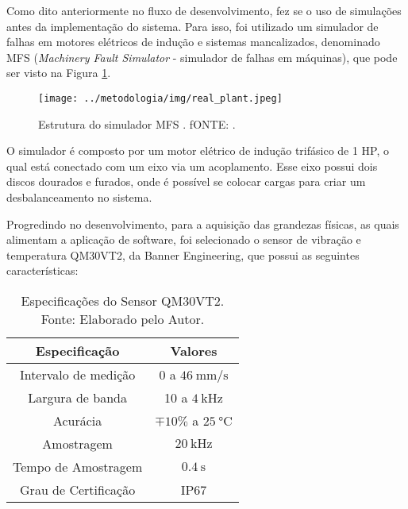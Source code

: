 \documentclass[a4paper]{ifacconf}
\begin{document}
Como dito anteriormente no fluxo de desenvolvimento, fez se o uso de simulações antes da implementação do sistema.
Para isso, foi utilizado um simulador de falhas em motores elétricos de indução e sistemas mancalizados, denominado
MFS \textsuperscript \textregistered (\textit{Machinery Fault Simulator} - simulador de falhas em máquinas), que pode ser visto na Figura 
\ref{fig:real_plant}.

\begin{figure}[H]
    \begin{center}
        \texttt{[image: ../metodologia/img/real\_plant.jpeg]}
    \end{center}
    \caption{Estrutura do simulador MFS \textsuperscript \textregistered. fONTE: \cite{SpectraQuest2011}.}
    \label{fig:real_plant}
\end{figure}

O simulador é composto por um motor elétrico de indução trifásico de 1 HP, o qual está conectado com um eixo via um 
acoplamento. Esse eixo possui dois discos dourados e furados, onde é possível se colocar cargas para criar um desbalanceamento no sistema.

Progredindo no desenvolvimento, para a aquisição das grandezas físicas, as quais alimentam a aplicação de software, foi selecionado o sensor 
de vibração e temperatura QM30VT2, da Banner Engineering, que possui as seguintes características:

\begin{table}[H]
  \caption{Especificações do Sensor QM30VT2. Fonte: Elaborado pelo Autor.}
  \label{tab:espec_sensor}
  \centering
  \begin{minipage}{.33\textwidth}
    \begin{tabular*}{\textwidth}{c|c}
      \hline
      Especificação            & Valores                                     \\ \hline
      \hline
      Intervalo de medição     &  0 a $\SI{46}{\milli\metre\per\second}$     \\
      Largura de banda         &  10 a $\SI{4}{\kilo\hertz}$                 \\ 
      Acurácia                 &  $\mp 10 \%$ a $\SI{25}{\celsius}$          \\
      Amostragem               &  $\SI{20}{\kilo\hertz}$                     \\
      Tempo de Amostragem      &  $\SI{0.4}{\second}$                        \\
      Grau de Certificação     &  IP67                                       \\ \hline
    \end{tabular*}
  \end{minipage}
\end{table}
\end{document}
